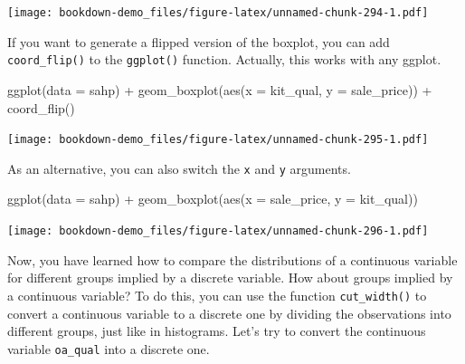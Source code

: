 \documentclass[
]{book}
\newenvironment{Shaded}{\begin{snugshade}}{\end{snugshade}}
\newcommand{\AttributeTok}[1]{\textcolor[rgb]{0.77,0.63,0.00}{#1}}
\newcommand{\DecValTok}[1]{\textcolor[rgb]{0.00,0.00,0.81}{#1}}
\newcommand{\FunctionTok}[1]{\textcolor[rgb]{0.00,0.00,0.00}{#1}}
\newcommand{\NormalTok}[1]{#1}
\newcommand{\SpecialCharTok}[1]{\textcolor[rgb]{0.00,0.00,0.00}{#1}}
\begin{document}
\texttt{[image: bookdown-demo\_files/figure-latex/unnamed-chunk-294-1.pdf]}

If you want to generate a flipped version of the boxplot, you can add \texttt{coord\_flip()} to the \texttt{ggplot()} function. Actually, this works with any ggplot.

\begin{Shaded}
\begin{Highlighting}[]
\FunctionTok{ggplot}\NormalTok{(}\AttributeTok{data =}\NormalTok{ sahp) }\SpecialCharTok{+} \FunctionTok{geom\_boxplot}\NormalTok{(}\FunctionTok{aes}\NormalTok{(}\AttributeTok{x =}\NormalTok{ kit\_qual, }\AttributeTok{y =}\NormalTok{ sale\_price)) }\SpecialCharTok{+}
  \FunctionTok{coord\_flip}\NormalTok{()}
\end{Highlighting}
\end{Shaded}

\texttt{[image: bookdown-demo\_files/figure-latex/unnamed-chunk-295-1.pdf]}

As an alternative, you can also switch the \texttt{x} and \texttt{y} arguments.

\begin{Shaded}
\begin{Highlighting}[]
\FunctionTok{ggplot}\NormalTok{(}\AttributeTok{data =}\NormalTok{ sahp) }\SpecialCharTok{+} \FunctionTok{geom\_boxplot}\NormalTok{(}\FunctionTok{aes}\NormalTok{(}\AttributeTok{x =}\NormalTok{ sale\_price, }\AttributeTok{y =}\NormalTok{ kit\_qual))}
\end{Highlighting}
\end{Shaded}

\texttt{[image: bookdown-demo\_files/figure-latex/unnamed-chunk-296-1.pdf]}

Now, you have learned how to compare the distributions of a continuous variable for different groups implied by a discrete variable. How about groups implied by a continuous variable? To do this, you can use the function \texttt{cut\_width()} to convert a continuous variable to a discrete one by dividing the observations into different groups, just like in histograms. Let's try to convert the continuous variable \texttt{oa\_qual} into a discrete one.

\begin{Shaded}
\end{Shaded}
\end{document}
